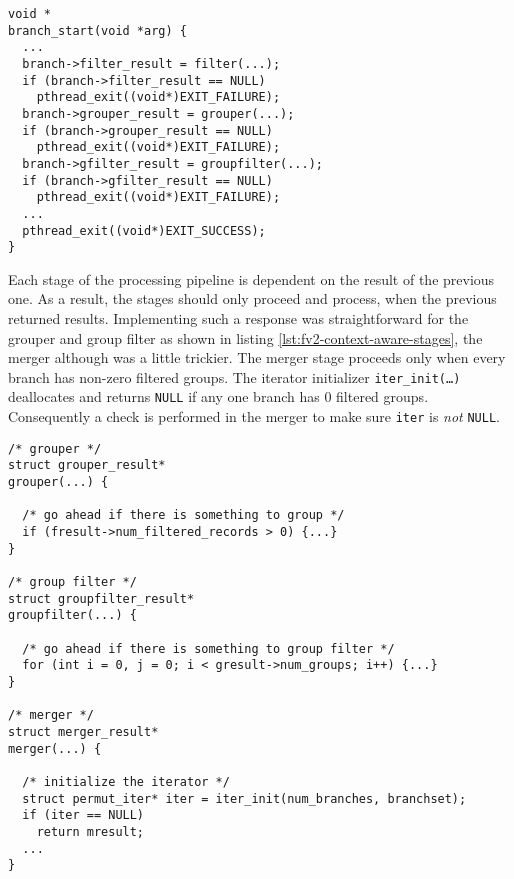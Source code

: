 \begin{lstlisting}
void *
branch_start(void *arg) {
  ...
  branch->filter_result = filter(...);
  if (branch->filter_result == NULL)
    pthread_exit((void*)EXIT_FAILURE);
  branch->grouper_result = grouper(...);
  if (branch->grouper_result == NULL)
    pthread_exit((void*)EXIT_FAILURE);
  branch->gfilter_result = groupfilter(...);
  if (branch->gfilter_result == NULL)
    pthread_exit((void*)EXIT_FAILURE);
  ...
  pthread_exit((void*)EXIT_SUCCESS);
}
\end{lstlisting}




Each stage of the processing pipeline is dependent on the result of the
previous one. As a result, the stages should only proceed and process, when
the previous returned results. Implementing such a response was
straightforward  for the grouper and
group filter as shown in listing \ref{lst:fv2-context-aware-stages}, the
merger although was a little trickier.  The merger stage proceeds only when
every branch has non-zero filtered groups.  The iterator initializer
\texttt{iter\_init(\ldots)} deallocates and returns \texttt{NULL} if any one
branch has $0$ filtered groups.  Consequently a check is performed in the
merger to make sure \texttt{iter} is \emph{not} \texttt{NULL}.

\begin{lstlisting}
/* grouper */
struct grouper_result*
grouper(...) {

  /* go ahead if there is something to group */
  if (fresult->num_filtered_records > 0) {...}
}

/* group filter */
struct groupfilter_result*
groupfilter(...) {

  /* go ahead if there is something to group filter */
  for (int i = 0, j = 0; i < gresult->num_groups; i++) {...}
}

/* merger */
struct merger_result*
merger(...) {

  /* initialize the iterator */
  struct permut_iter* iter = iter_init(num_branches, branchset);
  if (iter == NULL)
    return mresult;
  ...
}
\end{lstlisting}
